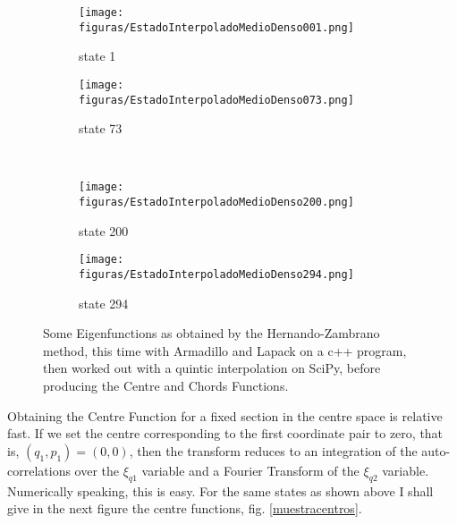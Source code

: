\documentclass[a4paper,12pt]{article}
\begin{document}
\begin{figure}[h]
  \centering
  \begin{subfigure}[b]{0.48\textwidth}
    \texttt{[image: figuras/EstadoInterpoladoMedioDenso001.png]}
    \caption{state 1}
    \label{fig:gull}
  \end{subfigure}%
  \begin{subfigure}[b]{0.48\textwidth}
    \texttt{[image: figuras/EstadoInterpoladoMedioDenso073.png]}
    \caption{state 73}
    \label{fig:tiger}
  \end{subfigure}\\
  \begin{subfigure}[b]{0.48\textwidth}
    \texttt{[image: figuras/EstadoInterpoladoMedioDenso200.png]}
    \caption{state 200}
    \label{fig:mouse}
  \end{subfigure}
  \begin{subfigure}[b]{0.48\textwidth}
    \texttt{[image: figuras/EstadoInterpoladoMedioDenso294.png]}
    \caption{state 294}
    \label{fig:mouse}
  \end{subfigure}
  \caption{Some Eigenfunctions as obtained by the Hernando-Zambrano method,
this time with Armadillo and Lapack on a  c++   
program, then worked out with a quintic interpolation on SciPy, before
producing the Centre and Chords Functions.} 
  \label{exampleinterpol}
\end{figure}

Obtaining the Centre Function for a fixed section in the centre space is
relative fast. If we set the centre corresponding to the first coordinate pair
to zero, that is, $(q_1,p_1)=(0,0)$, then the transform reduces to
an integration of the auto-correlations over the $\xi_{q1}$ variable and 
a Fourier Transform of the $\xi_{q2}$ variable. Numerically speaking, this is 
easy. For the same states as shown above I shall give in the next figure
the centre functions, fig. \ref{muestracentros}.
\end{document}
